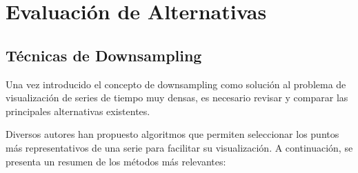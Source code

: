 \section{Evaluación de Alternativas}
\label{alternatives}

\subsection{Técnicas de Downsampling}

Una vez introducido el concepto de downsampling como solución al problema de visualización de series de tiempo muy densas, es necesario revisar y comparar las principales alternativas existentes.

Diversos autores han propuesto algoritmos que permiten seleccionar los puntos más representativos de una serie para facilitar su visualización. A continuación, se presenta un resumen de los métodos más relevantes:


